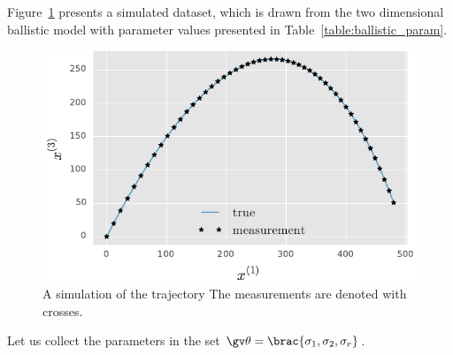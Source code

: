 Figure~\ref{fig:ballistic2D_simulation} presents  a simulated dataset, 
which is drawn from the two dimensional ballistic model with parameter
values presented in Table~\ref{table:ballistic_param}.

\begin{table}[htbp]
\caption{Parameter values used for simulation in Section~\ref{sec:ballistic}}
\label{table:ballistic_param}
\centering
{}
\end{table}

\begin{figure}[htbp]%
    \centering%
    \includegraphics{img/ballistic_trajectory}%
	\caption{A simulation of the trajectory%
   	The measurements are denoted with crosses.}\label{fig:ballistic2D_simulation}
 \end{figure}

Let us collect the parameters in the set $\Th=\brac{\sigma_1,\sigma_2,\sigma_r}$.

